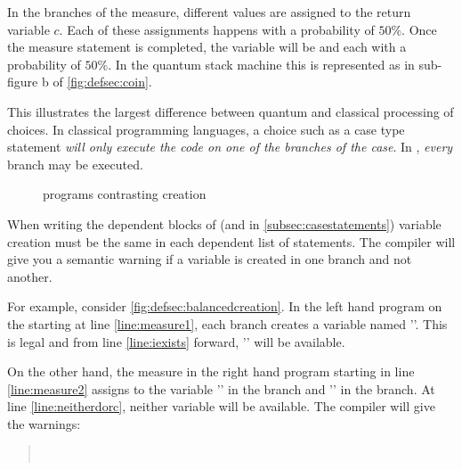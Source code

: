 In the branches of the measure,  different values are assigned to the 
return variable $c$. Each of these assignments happens with a probability of
$50\%$. Once the measure statement is completed, the variable 
will be  and  each with a probability of $50\%$.
In the quantum stack machine this is represented as in 
sub-figure b of \vref{fig:defsec:coin}.


This illustrates the largest difference between quantum and classical 
processing of choices. In classical programming languages, a choice such
as a case type statement 
\emph{will only execute the code on one of the branches of the case}. 
In \lqpl{}, \emph{every} branch may be executed.


\begin{figure}[htbp]
\centering
{}
\qquad
{}
\caption{\lqpl{} programs contrasting creation}
\label{fig:defsec:balancedcreation}
\end{figure}

When writing the dependent blocks of 
 (and  in \vref{subsec:casestatements}) 
 variable creation must be
the same in each dependent list of statements.
 The compiler will give you a semantic
warning if a variable is created in one branch and not another.

For example, consider \vref{fig:defsec:balancedcreation}. In the left 
hand program on the 
 starting at line \ref{line:measure1}, each branch creates a 
variable named ''. This is legal and from line \ref{line:iexists}
forward,  '' will be available.

On the other hand, the measure in the right hand program  starting in line 
\ref{line:measure2} assigns to the variable  '' in
the  branch and  '' in the  branch. At line
\ref{line:neitherdorc}, neither variable will be available. The compiler
will give the warnings:
\begin{quote}
\footnotesize
{}\\
\end{quote}

